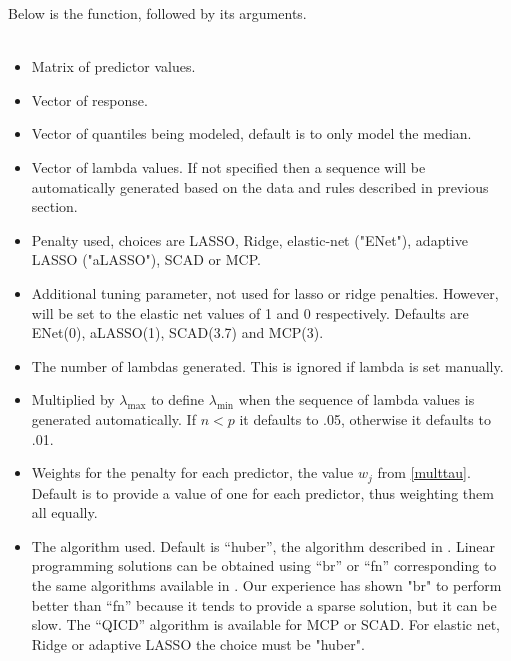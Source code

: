 \documentclass[article]{rqPenVignette}%
\begin{document}
Below is the  function, followed by its arguments. 
\\
\\
\begin{itemize}
\item[\code{x}] Matrix of predictor values. 
\item[\code{y}] Vector of response. 
\item[\code{tau}] Vector of quantiles being modeled, default is to only model the median.
\item[\code{lambda}] Vector of lambda values. If not specified then a sequence will be automatically generated based on the data and rules described in previous section. 
\item[\code{penalty}] Penalty used, choices are LASSO, Ridge, elastic-net ("ENet"), adaptive LASSO ("aLASSO"), SCAD or MCP. 
\item[\code{a}] Additional tuning parameter, not used for lasso or ridge penalties. However, will be set to the elastic net values of 1 and 0 respectively. Defaults are ENet(0), aLASSO(1), SCAD(3.7) and MCP(3).
\item[\code{nlambda}] The number of lambdas generated. This is ignored if lambda is set manually. 
\item[\code{eps}] Multiplied by $\lambda_{\max}$ to define $\lambda_{\min}$ when the sequence of lambda values is generated automatically. If $n<p$ it defaults to .05, otherwise it defaults to .01. 
\item[\code{penalty.factor}] Weights for the penalty for each predictor, the value $w_j$ from \eqref{multtau}. Default is to provide a value of one for each predictor, thus weighting them all equally. 
\item[\code{alg}] The algorithm used. Default is ``huber'', the algorithm described in \citet{huber_cd}. Linear programming solutions can be obtained using ``br'' or ``fn'' corresponding to the same algorithms available in .  Our experience has shown "br" to perform better than ``fn'' because it tends to provide a sparse solution, but it can be slow. The ``QICD'' algorithm is available for MCP or SCAD. For elastic net, Ridge or adaptive LASSO the choice must be "huber".

\end{itemize}
\end{document}
